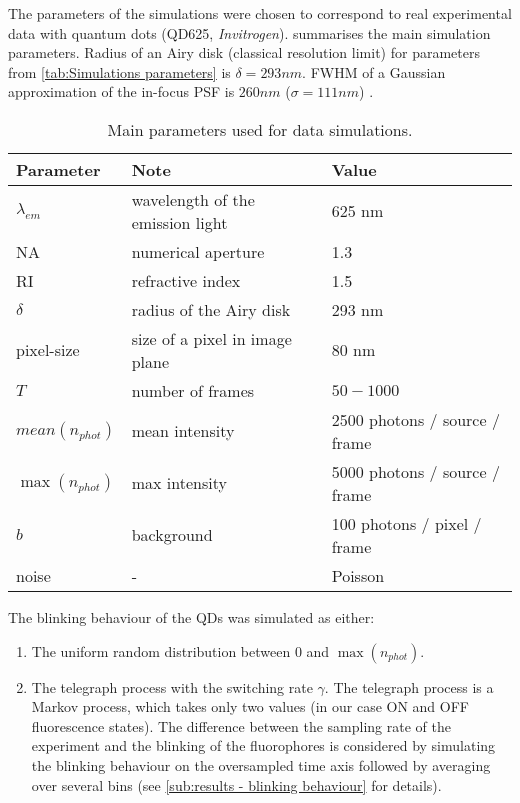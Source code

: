 The parameters of the simulations were chosen to correspond to real experimental data with quantum dots (QD625, \emph{Invitrogen}).   summarises the main simulation parameters. Radius of an Airy disk (classical resolution limit) for parameters from \autoref{tab:Simulations parameters} is $\delta=293 \unit{nm}$. FWHM of a Gaussian approximation of the in-focus PSF is $260\unit{nm}$ ($\sigma = 111\unit{nm}$) \cite{Zhang2007}.
%
\begin{table}[!h]	
	\centering
	\begin{tabular}{|l|l|l|}		
		\hline \small
		\bf Parameter 		& \bf Note  			& \bf Value\tabularnewline
		\hline %
		$\lambda_{em}$ 	& wavelength of the emission light 	& 625 nm\tabularnewline
		NA 				& numerical aperture 	& 1.3\tabularnewline
		RI 				& refractive index 		& 1.5\tabularnewline
		$\delta$ 			& radius of the Airy disk 	& 293 nm\tabularnewline		
		pixel-size 			& size of a pixel in image plane	& 80 nm\tabularnewline
		$T$ 				& number of frames  		& $50-1000$\tabularnewline
		$\unit{mean}(n_{phot})$ & mean intensity  		& 2500 photons / source / frame\tabularnewline
		$\max(n_{phot})$ 	& max intensity	 		& 5000 photons / source / frame\tabularnewline
		$b$ 				& background 			& 100 photons / pixel / frame\tabularnewline
		noise			& -					& Poisson\tabularnewline
		\hline
	\end{tabular}
	\caption{Main parameters used for data simulations.}
	\label{tab:Simulations parameters}
\end{table}

The blinking behaviour of the QDs was simulated as either:
%
\begin{enumerate}
	\item
	The uniform random distribution between $0$ and $\max(n_{phot})$.
	\item
	The telegraph process with the switching rate $\gamma$. The telegraph process is a Markov process, which takes only two values (in our case ON and OFF fluorescence states). The difference between the sampling rate of the experiment and the blinking of the fluorophores is considered by simulating the blinking behaviour on the oversampled time axis followed by averaging over several bins (see \autoref{sub:results - blinking behaviour} for details). 
\end{enumerate}
 

